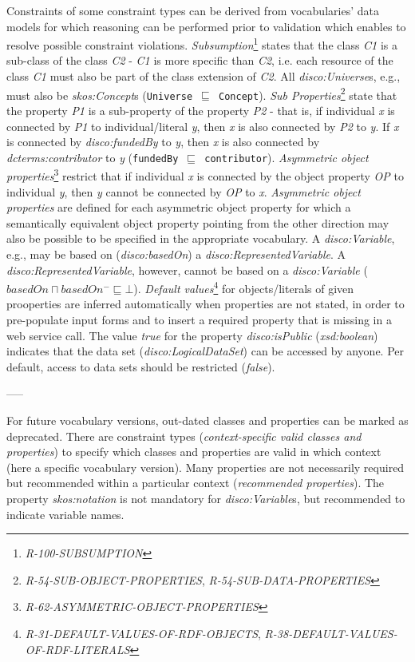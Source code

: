 \documentclass{llncs}
\newcommand{\ms}[1]{\texttt{#1}}
\begin{document}
Constraints of some constraint types can be derived from vocabularies' data models for which reasoning can be performed prior to validation which enables to resolve possible constraint violations.
\emph{Subsumption}\footnote{\emph{R-100-SUBSUMPTION}} states that the class \emph{C1} is a sub-class of the class \emph{C2} - \emph{C1} is more specific than \emph{C2}, 
i.e. each resource of the class \emph{C1} must also be part of the class extension of \emph{C2}. 
All \emph{disco:Universe}s, e.g., must also be \emph{skos:Concept}s (\ms{Universe $\sqsubseteq$ Concept}).
\emph{Sub Properties}\footnote{\emph{R-54-SUB-OBJECT-PROPERTIES}, \emph{R-54-SUB-DATA-PROPERTIES}} state that the property \emph{P1} is a sub-property of the property \emph{P2} - that is, if individual \emph{x} is connected by \emph{P1} to individual/literal \emph{y}, then \emph{x} is also connected by \emph{P2} to \emph{y}. 
If \emph{x} is connected by \emph{disco:fundedBy} to \emph{y}, then \emph{x} is also connected by \emph{dcterms:contributor} to \emph{y} (\ms{fundedBy $\sqsubseteq$ contributor}).
\emph{Asymmetric object properties}\footnote{\emph{R-62-ASYMMETRIC-OBJECT-PROPERTIES}} restrict that if individual \emph{x} is connected by the object property \emph{OP} to individual \emph{y}, then \emph{y} cannot be connected by \emph{OP} to \emph{x}. 
\emph{Asymmetric object properties} are defined for each asymmetric object property for which a semantically equivalent object property pointing from the other direction may also be possible to be specified in the appropriate vocabulary.
A \emph{disco:Variable}, e.g., may be based on (\emph{disco:basedOn}) a \emph{disco:RepresentedVariable}.
A \emph{disco:RepresentedVariable}, however, cannot be based on a \emph{disco:Variable} (\ms{$basedOn \sqcap basedOn^{-} \sqsubseteq \bot$}).
\emph{Default values}\footnote{{\em R-31-DEFAULT-VALUES-OF-RDF-OBJECTS}, {\em R-38-DEFAULT-VALUES-OF-RDF-LITERALS}} for objects/literals of given prooperties are inferred automatically when properties are not stated, in order to pre-populate input forms and to insert a required property that is missing in a web service call.
The value \emph{true} for the property {\em disco:isPublic} ({\em xsd:boolean}) indicates that the data set ({\em disco:LogicalDataSet}) can be accessed by anyone.
Per default, access to data sets should be restricted (\emph{false}).

-----

For future vocabulary versions, out-dated classes and properties can be marked as deprecated.
There are constraint types (\emph{context-specific valid classes and properties}) to specify which classes and properties are valid in which context (here a specific vocabulary version).
Many properties are not necessarily required but recommended within a particular context (\emph{recommended properties}).
The property {\em skos:notation} is not mandatory for {\em disco:Variable}s, but recommended to indicate variable names.
\end{document}
